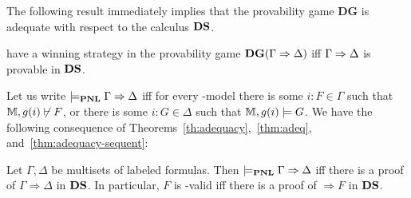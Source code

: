 The following result immediately implies that the provability game $\mathbf{DG}$ is adequate with respect to the calculus $\mathbf{DS}$.

\begin{theorem}\label{thm:adequacy-sequent}
\Ic have a winning strategy in the provability game $\mathbf{DG}(\Gamma\Rightarrow\Delta)$  iff $\Gamma\Rightarrow\Delta$ is provable in $\mathbf{DS}$. 
\end{theorem}

Let us write $\models_{\textbf{PNL}} \Gamma \Rightarrow \Delta$ iff for every \PNL-model there is some $i:F \in \Gamma$ such that $\M,\g(i)\not\vdash F$, or there is some $i:G \in \Delta$ such that $\M,\g(i)\models G$. We have the following consequence of Theorems~\ref{th:adequacy},~\ref{thm:adeq}, and~\ref{thm:adequacy-sequent}: 

\begin{corollary}
Let $\Gamma,\Delta$ be multisets of labeled formulas. Then $\models_{\textbf{PNL}}\Gamma \Rightarrow \Delta$ iff there is a proof of $\Gamma \Rightarrow \Delta$ in $\mathbf{DS}$. In particular, $ F $ is \PNL-valid iff there is a proof of $\Rightarrow  F $ in $\mathbf{DS}$.
\end{corollary}

